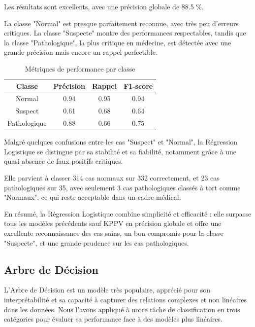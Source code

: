 \documentclass[twocolumn,10pt]{article}
\begin{document}
Les résultats sont excellents, avec une précision globale de 88.5 \%.

La classe "Normal" est presque parfaitement reconnue, avec très peu d’erreurs critiques. La classe "Suspecte" montre des performances respectables, tandis que la classe "Pathologique", la plus critique en médecine, est détectée avec une grande précision mais encore un rappel perfectible.

\begin{table}[htbp]
\centering
\caption{\label{tab:perf}Métriques de performance par classe}
\begin{tabular}{cccc}
\toprule
Classe & Précision & Rappel & F1-score \\
\midrule
Normal & 0.94 & 0.95 & 0.94 \\
Suspect & 0.61 & 0.68 & 0.64 \\
Pathologique & 0.88 & 0.66 & 0.75 \\
\bottomrule
\end{tabular}
\end{table}

Malgré quelques confusions entre les cas "Suspect" et "Normal", la Régression Logistique se distingue par sa stabilité et sa fiabilité, notamment grâce à une quasi-absence de faux positifs critiques.

Elle parvient à classer 314 cas normaux sur 332 correctement, et 23 cas pathologiques sur 35, avec seulement 3 cas pathologiques classés à tort comme "Normaux", ce qui reste acceptable dans un cadre médical.

En résumé, la Régression Logistique combine simplicité et efficacité : elle surpasse tous les modèles précédents sauf KPPV en précision globale et offre une excellente reconnaissance des cas sains, un bon compromis pour la classe "Suspecte", et une grande prudence sur les cas pathologiques.

\subsection{Arbre de Décision}\label{subsec:sup:reg_log}
L'Arbre de Décision est un modèle très populaire, apprécié pour son interprétabilité et sa capacité à capturer des relations complexes et non linéaires dans les données. Nous l'avons appliqué à notre tâche de classification en trois catégories pour évaluer sa performance face à des modèles plus linéaires.

\end{document}
